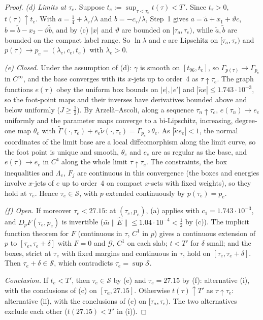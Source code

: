 \documentclass[11pt]{article}
\begin{document}
\begin{proof}
\emph{(d) Limits at $\tau_e$.} Suppose $t_e:=\sup_{\tau<\tau_e}t(\tau)<T'$. Since $t_\tau>0$, $t(\tau)\uparrow t_e$. With $a=\frac14+\lambda_\tau/\lambda$ and $b=-c_\tau/\lambda$, Step~1 gives $a=\tilde a+x_1+\vartheta c$, $b=\tilde b-x_2-\vartheta\tilde b$, and by (c) $|x|$ and $\vartheta$ are bounded on $[\tau_a,\tau_e)$, while $\tilde a,\tilde b$ are bounded on the compact label range. So $\ln\lambda$ and $c$ are Lipschitz on $[\tau_a,\tau_e)$ and $p(\tau)\to p_e=(\lambda_e,c_e,t_e)$ with $\lambda_e>0$.

\emph{(e) Closed.} Under the assumption of (d): $\gamma$ is smooth on $[t_{96},t_e]$, so $\Gamma_{p(\tau)}\to\Gamma_{p_e}$ in $C^\infty$, and the base converges with its $x$-jets up to order~4 as $\tau\uparrow\tau_e$. The graph functions $e(\tau)$ obey the uniform box bounds on $|e|,|e'|$ and $|\tilde\kappa e|\le1.743\cdot10^{-3}$, so the foot-point maps and their inverses have derivatives bounded above and below uniformly ($J\ge\frac12$). By Arzel\`a--Ascoli, along a sequence $\tau_n\uparrow\tau_e$, $e(\tau_n)\to e_e$ uniformly and the parameter maps converge to a bi-Lipschitz, increasing, degree-one map $\theta_e$ with $\tilde\Gamma(\cdot,\tau_e)+e_e\tilde\nu(\cdot,\tau_e)=\Gamma_{p_e}\circ\theta_e$. As $|\tilde\kappa e_e|<1$, the normal coordinates of the limit base are a local diffeomorphism along the limit curve, so the foot point is unique and smooth, $\theta_e$ and $e_e$ are as regular as the base, and $e(\tau)\to e_e$ in $C^4$ along the whole limit $\tau\uparrow\tau_e$. The constraints, the box inequalities and $\Lambda_e$, $F_j$ are continuous in this convergence (the boxes and energies involve $x$-jets of $e$ up to order~4 on compact $x$-sets with fixed weights), so they hold at $\tau_e$. Hence $\tau_e\in\mathcal S$, with $p$ extended continuously by $p(\tau_e)=p_e$.

\emph{(f) Open.} If moreover $\tau_e<27.15$: at $(\tau_e,p_e)$, (a) applies with $c_1=1.743\cdot10^{-3}$, and $D_pF(\tau_e,p_e)$ is invertible ($\bar m\|\hat E\|\le1.04\cdot10^{-4}<\frac12$ by (c)). The implicit function theorem for $F$ (continuous in $\tau$, $C^1$ in $p$) gives a continuous extension of $p$ to $[\tau_e,\tau_e+\delta]$ with $F=0$ and $\mathcal G$, $C^1$ on each slab; $t<T'$ for $\delta$ small; and the boxes, strict at $\tau_e$ with fixed margins and continuous in $\tau$, hold on $[\tau_e,\tau_e+\delta]$. Then $\tau_e+\delta\in\mathcal S$, which contradicts $\tau_e=\sup\mathcal S$.

\emph{Conclusion.} If $t_e<T'$, then $\tau_e\in\mathcal S$ by (e) and $\tau_e=27.15$ by (f): alternative (i), with the conclusions of (c) on $[\tau_a,27.15]$. Otherwise $t(\tau)\uparrow T'$ as $\tau\uparrow\tau_e$: alternative (ii), with the conclusions of (c) on $[\tau_a,\tau_e)$. The two alternatives exclude each other ($t(27.15)<T'$ in (i)).
\end{proof}
\end{document}
